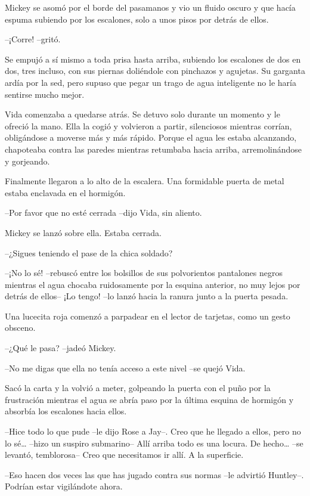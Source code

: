 {Mickey se asomó por el borde del pasamanos y vio un fluido oscuro y que
 hacía espuma subiendo por los escalones, solo a unos pisos por detrás de
ellos.}

{--¡Corre! --gritó.}

{Se empujó a sí mismo a toda prisa hasta arriba, subiendo los escalones
 de dos en dos, tres incluso, con sus piernas doliéndole con pinchazos y
 agujetas. Su garganta ardía por la sed, pero supuso que pegar un trago
de agua inteligente no le haría sentirse mucho mejor.}

{Vida comenzaba a quedarse atrás. Se detuvo solo durante un momento y le
 ofreció la mano. Ella la cogió y volvieron a partir, silenciosos
 mientras corrían, obligándose a moverse más y más rápido. Porque el agua
 les estaba alcanzando, chapoteaba contra las paredes mientras retumbaba
hacia arriba, arremolinándose y gorjeando.}

{Finalmente llegaron a lo alto de la escalera. Una formidable puerta de
metal estaba enclavada en el hormigón.}

{--Por favor que no esté cerrada --dijo Vida, sin aliento.}

{Mickey se lanzó sobre ella. Estaba cerrada.}

{--¿Sigues teniendo el pase de la chica soldado?}

{--¡No lo sé! --rebuscó entre los bolsillos de sus polvorientos
 pantalones negros mientras el agua chocaba ruidosamente por la esquina
 anterior, no muy lejos por detrás de ellos-- ¡Lo tengo! --lo lanzó hacia
la ranura junto a la puerta pesada.}

{Una lucecita roja comenzó a parpadear en el lector de tarjetas, como un
gesto obsceno.}

{--¿Qué le pasa? --jadeó Mickey.}

{--No me digas que ella no tenía acceso a este nivel --se quejó Vida.}

{Sacó la carta y la volvió a meter, golpeando la puerta con el puño por
 la frustración mientras el agua se abría paso por la última esquina de
hormigón y absorbía los escalones hacia ellos.}

\mbox{}

{--Hice todo lo que pude --le dijo Rose a Jay--. Creo que he llegado a
 ellos, pero no lo sé\ldots{} --hizo un suspiro submarino-- Allí arriba
 todo es una locura. De hecho\ldots{} --se levantó, temblorosa-- Creo que
necesitamos ir allí. A la superficie.}

{--Eso hacen dos veces las que has jugado contra sus normas --le
advirtió Huntley--. Podrían estar vigilándote ahora.}


